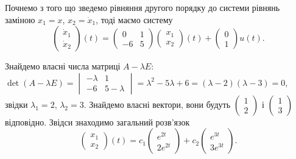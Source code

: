 \begin{solution}
    Почнемо з того що зведемо рівняння другого порядку до системи рівнянь заміною $x_1 = x$, $x_2 = \dot x_1$, тоді маємо систему
    \[ \begin{pmatrix} \dot x_1 \\ \dot x_2 \end{pmatrix} (t) = \begin{pmatrix} 0 & 1 \\ -6 & 5 \end{pmatrix} \begin{pmatrix} x_1 \\ x_2 \end{pmatrix} (t) + \begin{pmatrix} 0 \\ 1 \end{pmatrix} u(t). \]
    
    Знайдемо власні числа матриці $A - \lambda E$: $\det(A - \lambda E) = \begin{vmatrix} -\lambda & 1 \\ -6 & 5-\lambda \end{vmatrix} = \lambda^2 - 5\lambda + 6 = (\lambda - 2) (\lambda - 3) = 0$, звідки $\lambda_1 = 2$, $\lambda_2 = 3$. Знайдемо власні вектори, вони будуть $\begin{pmatrix} 1 \\ 2 \end{pmatrix}$ і $\begin{pmatrix} 1 \\ 3 \end{pmatrix}$ відповідно. Звідси знаходимо загальний розв'язок
    \[ \begin{pmatrix} x_1 \\ x_2 \end{pmatrix} (t) = c_1 \begin{pmatrix} e^{2t} \\ 2e^{2t} \end{pmatrix} + c_2 \begin{pmatrix} e^{3t} \\ 3e^{3t} \end{pmatrix}. \]
    

\end{solution}
